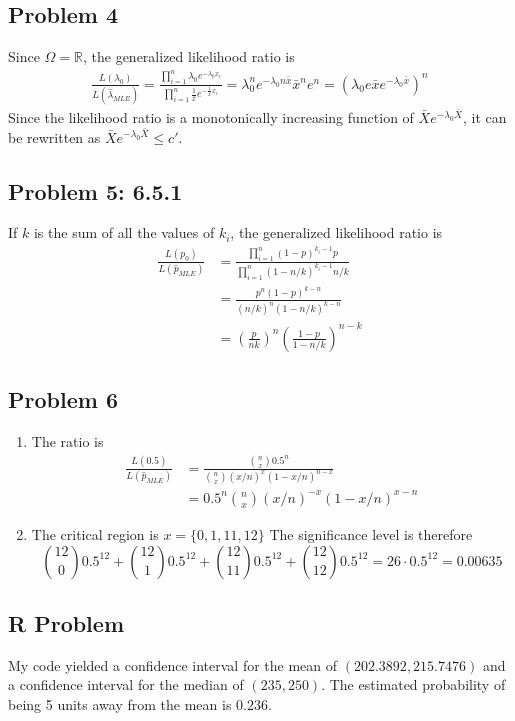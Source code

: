 \documentclass{article}
\begin{document}
\subsection*{Problem 4}

Since $\Omega = \mathbb{R}$, the generalized likelihood ratio is 
\begin{align*}
	\frac{L(\lambda_0)}{L(\hat{\lambda}_{MLE})}
	= \frac{\prod_{i=1}^n \lambda_0 e^{-\lambda_0x_i}}{\prod_{i=1}^n \frac{1}{\bar{x}}e^{-\frac{1}{\bar{x}}x_i}}
	= \lambda_0^n e^{-\lambda_0 n\bar{x}} \bar{x}^n e^n 
	= (\lambda_0e \bar{x} e^{-\lambda_0 \bar{x}}   )^n
\end{align*}
Since the likelihood ratio is a monotonically increasing function of $\bar{X}e^{-\lambda_0\bar{X}}$,
it can be rewritten as $\bar{X}e^{-\lambda_0\bar{X}} \leq c'$.
\newpage 

\subsection*{Problem 5: 6.5.1}
If $k$ is the sum of all the values of $k_i$, the generalized likelihood ratio is 
\begin{align*}
	\frac{L(p_0)}{L(\hat{p}_{MLE})}
	&= \frac{\prod_{i=1}^n (1-p)^{k_i-1}p}{\prod_{i=1}^n (1-n/k)^{k_i-1}n/k} \\
	&= \frac{p^n(1-p)^{k - n}}{(n/k)^n(1-n/k)^{k - n}} \\
	&=\left(\frac{p}{nk}\right)^n \left(\frac{1-p}{1-n/k}\right)^{n-k}
\end{align*}
\newpage

\subsection*{Problem 6}
\begin{enumerate}
	\item The ratio is 
	\begin{align*}
		\frac{L(0.5)}{L(\hat{p}_{MLE})}
		&= \frac{\binom{n}{x}0.5^n}{\binom{n}{x}(x/n)^x(1-x/n)^{n-x}} \\
		&= 0.5^n \binom{n}{x}(x/n)^{-x}(1-x/n)^{x-n}
	\end{align*}
	\item The critical region is $x = \{0, 1,11,12\}$
	The significance level is therefore 
	\[
		\binom{12}{0} 0.5^{12} + \binom{12}{1} 0.5^{12} + \binom{12}{11} 0.5^{12} + \binom{12}{12} 0.5^{12}
		= 26\cdot 0.5^{12}
		= 0.00635
	\]
\end{enumerate}
\newpage 

\subsection*{R Problem}
My code yielded a confidence interval for the mean of $(202.3892, 215.7476)$ and
a confidence interval for the median of $(235, 250)$.
The estimated probability of being 5 units away from the mean is $0.236$.
\end{document}

